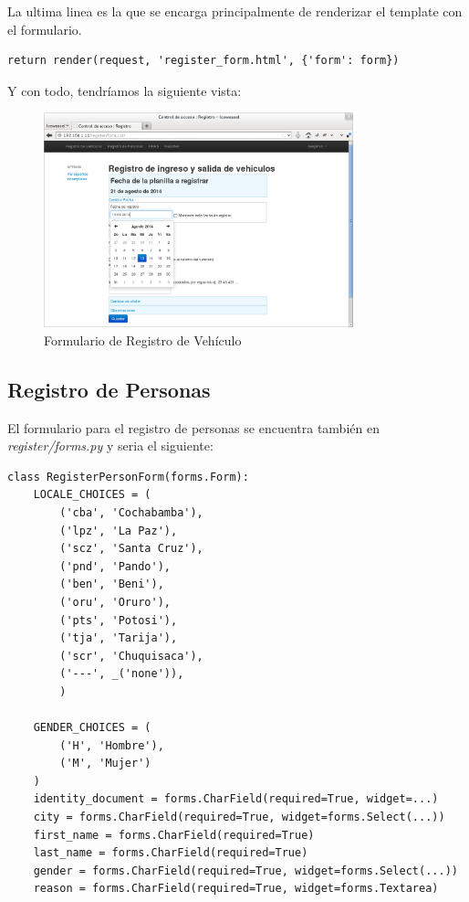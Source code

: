 La ultima linea es la que se encarga principalmente de renderizar el template con
el formulario.

\begin{verbatim}
return render(request, 'register_form.html', {'form': form})
\end{verbatim}

Y con todo, tendríamos la siguiente vista:

\begin{figure}[h]
  \begin{center}
    \includegraphics[width=0.8\textwidth]{figures/chapter5/registro2.png}
    \caption[Formulario de Registro de Vehículos]{Formulario de Registro de Vehículo}
  \end{center}
\end{figure}

\newpage

\subsection{Registro de Personas}
El formulario para el registro de personas se encuentra también en {\it register/forms.py}
y seria el siguiente:

\begin{verbatim}
class RegisterPersonForm(forms.Form):
    LOCALE_CHOICES = (
        ('cba', 'Cochabamba'),
        ('lpz', 'La Paz'),
        ('scz', 'Santa Cruz'),
        ('pnd', 'Pando'),
        ('ben', 'Beni'),
        ('oru', 'Oruro'),
        ('pts', 'Potosi'),
        ('tja', 'Tarija'),
        ('scr', 'Chuquisaca'),
        ('---', _('none')),
        )

    GENDER_CHOICES = (
        ('H', 'Hombre'),
        ('M', 'Mujer')
    )
    identity_document = forms.CharField(required=True, widget=...)
    city = forms.CharField(required=True, widget=forms.Select(...))
    first_name = forms.CharField(required=True)
    last_name = forms.CharField(required=True)
    gender = forms.CharField(required=True, widget=forms.Select(...))
    reason = forms.CharField(required=True, widget=forms.Textarea)
\end{verbatim}

